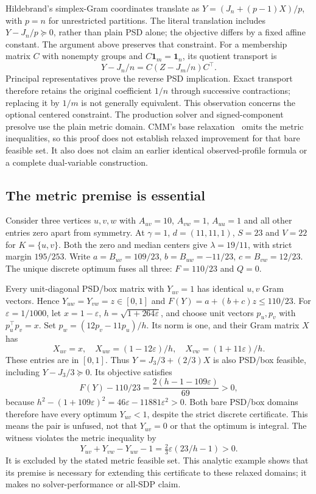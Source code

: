 \documentclass[sigconf,anonymous,review]{acmart}
\newcommand{\1}{\mathbf{1}}
\begin{document}
Hildebrand's simplex-Gram coordinates translate as
$Y=(J_n+(p-1)X)/p$, with $p=n$ for unrestricted partitions. The literal
translation includes $Y-J_n/p\succeq0$, rather than plain PSD alone; the
objective differs by a fixed affine constant. The argument above preserves
that constraint. For a membership matrix $C$ with nonempty groups and
$C\1_m=\1_n$, its quotient transport is
\[
 Y-J_n/n=C(Z-J_m/n)C^\top.
\]
Principal representatives prove the reverse PSD implication. Exact transport
therefore retains the original coefficient $1/n$ through successive
contractions; replacing it by $1/m$ is not generally equivalent.
This observation concerns the optional centered constraint. The production
solver and signed-component presolve use the plain metric domain.
CMM's base relaxation~\cite{chen2018convexified} omits the
metric inequalities, so this proof does not establish relaxed improvement
for that bare feasible set. It also does not claim an earlier identical
observed-profile formula or a complete dual-variable construction.

\subsection{The metric premise is essential}\label{app:metric-necessity}
Consider three vertices $u,v,w$ with $A_{uv}=10$, $A_{vw}=1$, $A_{uu}=1$
and all other entries zero apart from symmetry. At $\gamma=1$,
$d=(11,11,1)$, $S=23$ and $V=22$ for $K=\{u,v\}$.
Both the zero and median centers give $\lambda=19/11$, with strict margin
$195/253$. Write $a=B_{uv}=109/23$, $b=B_{uw}=-11/23$,
$c=B_{vw}=12/23$. The unique discrete optimum fuses all three:
$F=110/23$ and $Q=0$.

Every unit-diagonal PSD/box matrix with $Y_{uv}=1$ has identical $u,v$
Gram vectors. Hence $Y_{uw}=Y_{vw}=z\in[0,1]$ and
$F(Y)=a+(b+c)z\le110/23$.
For $\varepsilon=1/1000$, let $x=1-\varepsilon$,
$h=\sqrt{1+264\varepsilon}$, and choose unit vectors $p_u,p_v$ with
$p_u^\top p_v=x$. Set $p_w=(12p_v-11p_u)/h$.
Its norm is one, and their Gram matrix $X$ has
\[
 X_{uv}=x,\quad X_{uw}=(1-12\varepsilon)/h,\quad
 X_{vw}=(1+11\varepsilon)/h.
\]
These entries are in $[0,1]$. Thus $Y=J_3/3+(2/3)X$ is also PSD/box feasible,
including $Y-J_3/3\succeq0$. Its objective satisfies
\[
 F(Y)-110/23=\frac{2(h-1-109\varepsilon)}{69}>0,
\]
because $h^2-(1+109\varepsilon)^2
=46\varepsilon-11881\varepsilon^2>0$.
Both bare PSD/box domains therefore have every optimum $Y_{uv}<1$, despite
the strict discrete certificate. This means the pair is unfused, not that
$Y_{uv}=0$ or that the optimum is integral. The witness violates the metric
inequality by
\[
 Y_{uv}+Y_{vw}-Y_{uw}-1
 =\tfrac23\varepsilon(23/h-1)>0.
\]
It is excluded by the stated metric feasible set. This analytic example shows
that its premise is necessary for extending this certificate to these relaxed
domains; it makes no solver-performance or all-SDP claim.
\end{document}
